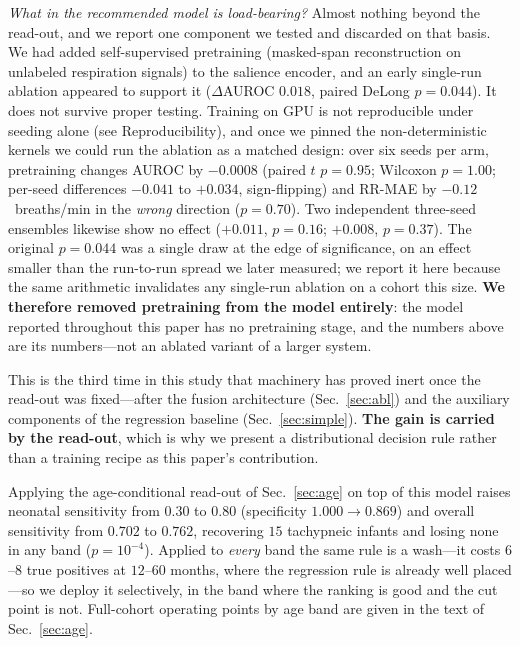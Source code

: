 \documentclass[journal]{IEEEtran}
\begin{document}
\emph{What in the recommended model is load-bearing?} Almost nothing beyond the read-out, and we report
one component we tested and discarded on that basis. We had added self-supervised pretraining (masked-span
reconstruction on unlabeled respiration signals) to the salience encoder, and an early single-run ablation
appeared to support it ($\Delta$AUROC $0.018$, paired DeLong $p=0.044$). It does not survive proper
testing. Training on GPU is not reproducible under seeding alone (see Reproducibility), and once we pinned
the non-deterministic kernels we could run the ablation as a matched design: over six seeds per arm,
pretraining changes AUROC by $-0.0008$ (paired $t$ $p=0.95$; Wilcoxon $p=1.00$; per-seed differences
$-0.041$ to $+0.034$, sign-flipping) and RR-MAE by $-0.12$~breaths/min in the \emph{wrong} direction
($p=0.70$). Two independent three-seed ensembles likewise show no effect ($+0.011$, $p=0.16$; $+0.008$,
$p=0.37$). The original $p=0.044$ was a single draw at the edge of significance, on an effect smaller than
the run-to-run spread we later measured; we report it here because the same arithmetic invalidates any
single-run ablation on a cohort this size. \textbf{We therefore removed pretraining from the model
entirely}: the model reported throughout this paper has no pretraining stage, and the numbers above are
its numbers---not an ablated variant of a larger system.

This is the third time in this study that machinery has proved inert once the read-out was fixed---after
the fusion architecture (Sec.~\ref{sec:abl}) and the auxiliary components of the regression baseline
(Sec.~\ref{sec:simple}). \textbf{The gain is carried by the read-out}, which is why we present a
distributional decision rule rather than a training recipe as this paper's contribution.

Applying the age-conditional read-out of Sec.~\ref{sec:age} on top of this model raises neonatal
sensitivity from $0.30$ to $0.80$ (specificity $1.000\rightarrow0.869$) and overall sensitivity from
$0.702$ to $0.762$, recovering $15$ tachypneic infants and losing none in any band
($p=10^{-4}$). Applied to \emph{every} band the same rule is a wash---it costs $6$--$8$ true positives
at $12$--$60$ months, where the regression rule is already well placed---so we deploy it selectively,
in the band where the ranking is good and the cut point is not. Full-cohort operating points by age band are given in the text of Sec.~\ref{sec:age}.
\end{document}
